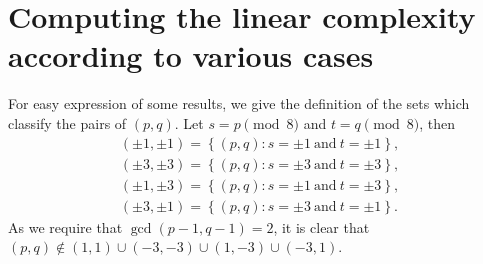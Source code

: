 \documentclass{mcom-l}
\theoremstyle{definition}
\numberwithin{equation}{section}
\begin{document}
   \section{Computing the linear complexity according to various cases}
         For easy expression of some results, we give the definition of the sets which classify the pairs of $ (p,q) $. Let $ s=p\pmod 8 $ and $ t=q\pmod 8 $, then
         \begin{equation*}
         \begin{split}
         (\pm{1},\pm{1})=\left\lbrace(p,q):s=\pm 1 \ \text{and}\ t=\pm 1\right\rbrace,\\
         (\pm{3},\pm{3})=\left\lbrace(p,q):s=\pm 3 \ \text{and}\ t=\pm 3\right\rbrace,\\
         (\pm{1},\pm{3})=\left\lbrace(p,q):s=\pm 1 \ \text{and}\ t=\pm 3\right\rbrace,\\
         (\pm{3},\pm{1})=\left\lbrace(p,q):s=\pm 3 \ \text{and}\ t=\pm 1\right\rbrace.
         \end{split}
         \end{equation*}
         As we require that $ \gcd(p-1,q-1)=2 $, it is clear that $ (p,q)\notin(1,1)\cup (-3,-3) \cup (1,-3)\cup (-3,1)$.
         
\end{document}

